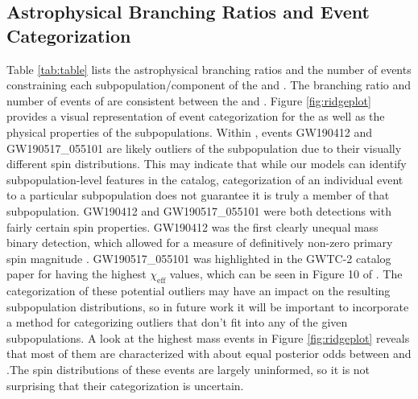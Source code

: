 \subsection{Astrophysical Branching Ratios and Event Categorization}

Table \ref{tab:table} lists the astrophysical branching ratios and the number of events constraining each subpopulation/component of the \base{} and \comp{}. The branching ratio and number of events of \first{} are consistent between the \base{} and \comp{}. Figure \ref{fig:ridgeplot} provides a visual representation of event categorization for the \comp{} as well as the physical properties of the subpopulations. Within \contA{}, events GW190412 and GW190517\_055101 are likely outliers of the subpopulation due to their visually different spin distributions. This may indicate that while our models can identify subpopulation-level features in the catalog, categorization of an individual event to a particular subpopulation does not guarantee it is truly a member of that subpopulation. GW190412 and GW190517\_055101 were both detections with fairly certain spin properties. GW190412 was the first clearly unequal mass binary detection, which allowed for a measure of definitively non-zero primary spin magnitude \citep{10.3847/2041-8213/aba8ef, 2010.14527}. GW190517\_055101 was highlighted in the GWTC-2 catalog paper \citet{2010.14527} for having the highest $\chi_\text{eff}$ values, which can be seen in Figure 10 of \citet{2010.14527}. The categorization of these potential outliers may have an impact on the resulting subpopulation distributions, so in future work it will be important to incorporate a method for categorizing outliers that don't fit into any of the given subpopulations. A look at the highest mass events in Figure \ref{fig:ridgeplot} reveals that most of them are characterized with about equal posterior odds between \contA{} and \contB{}.The spin distributions of these events are largely uninformed, so it is not surprising that their categorization is uncertain.

